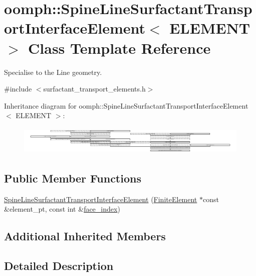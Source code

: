 \hypertarget{classoomph_1_1SpineLineSurfactantTransportInterfaceElement}{}\section{oomph\+:\+:Spine\+Line\+Surfactant\+Transport\+Interface\+Element$<$ E\+L\+E\+M\+E\+NT $>$ Class Template Reference}
\label{classoomph_1_1SpineLineSurfactantTransportInterfaceElement}


Specialise to the Line geometry.  




{\ttfamily \#include $<$surfactant\+\_\+transport\+\_\+elements.\+h$>$}

Inheritance diagram for oomph\+:\+:Spine\+Line\+Surfactant\+Transport\+Interface\+Element$<$ E\+L\+E\+M\+E\+NT $>$\+:\begin{figure}[H]
\begin{center}
\leavevmode
\includegraphics[height=1.378461cm]{classoomph_1_1SpineLineSurfactantTransportInterfaceElement}
\end{center}
\end{figure}
\subsection*{Public Member Functions}
\begin{DoxyCompactItemize}
\item 
\hyperlink{classoomph_1_1SpineLineSurfactantTransportInterfaceElement_a0b9ae72a734043e18ef9fc55629de3b6}{Spine\+Line\+Surfactant\+Transport\+Interface\+Element} (\hyperlink{classoomph_1_1FiniteElement}{Finite\+Element} $\ast$const \&element\+\_\+pt, const int \&\hyperlink{classoomph_1_1FaceElement_a478d577ac6db67ecc80f1f02ae3ab170}{face\+\_\+index})
\end{DoxyCompactItemize}
\subsection*{Additional Inherited Members}


\subsection{Detailed Description}
